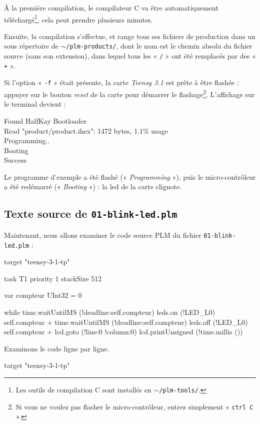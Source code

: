 À la première compilation, le compilateur C va être automatiquement téléchargé\footnote{Les outils de compilation C sont installés en \texttt{$\sim$/plm-tools/}.}, cela peut prendre plusieurs minutes.

Ensuite, la compilation s'effectue, et range tous ses fichiers de production dans un sous répertoire de \texttt{$\sim$/plm-products/}, dont le nom est le  chemin absolu du fichier source (sans son extension), dans lequel tous les « \texttt{/} » ont été remplacés par des « \texttt{+} ».

Si l'option « \texttt{-f} » était présente, la carte \emph{Teensy 3.1} est prête à être flashée : appuyer sur le bouton \emph{reset} de la carte pour démarrer le flashage\footnote{Si vous ne voulez pas flasher le micro-contrôleur, entrez simplement « \texttt{ctrl~C} ».}. L'affichage sur le terminal devient :
\begin{SHELL}
Found HalfKay Bootloader\\
Read "product/product.ihex": 1472 bytes, 1.1\% usage\\
Programming..\\
Booting\\
Success
\end{SHELL}

Le programme d'exemple a été flashé (« \emph{Programming} »), puis le micro-contrôleur a été redémarré (« \emph{Booting} ») : la led de la carte clignote.

\subsection{Texte source de \texttt{01-blink-led.plm}}

Maintenant, nous allons examiner le code source PLM du fichier \texttt{01-blink-led.plm} :

\begin{PLM}[1]
target "teensy-3-1-tp"

task T1 priority 1 stackSize 512 {
  var compteur UInt32 = 0

  while time.waitUntilMS (!deadline:self.compteur) {
    leds.on (!LED_L0)
    self.compteur +%
    time.waitUntilMS (!deadline:self.compteur)
    leds.off (!LED_L0)
    self.compteur +%
    lcd.goto (!line:0 !column:0)
    lcd.printUnsigned (!time.millis ())
  }
}
\end{PLM}

Examinons le code ligne par ligne.

\begin{PLM}[1]
target "teensy-3-1-tp"
\end{PLM}

